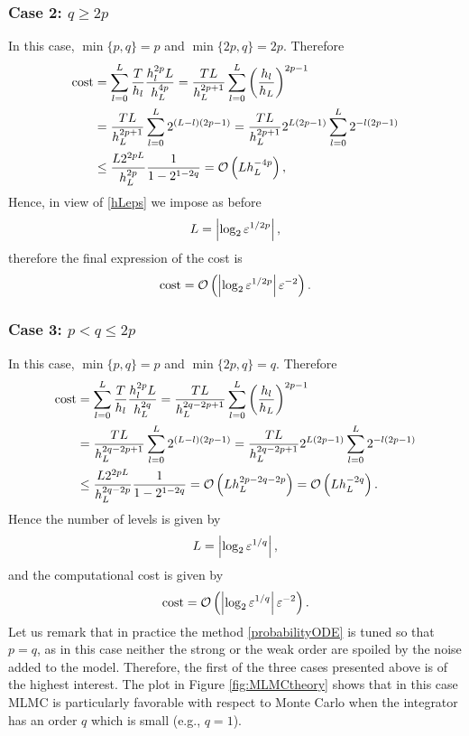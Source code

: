 \subsubsection*{Case 2: $q \geq 2p$}
In this case, $\min\{p, q\} = p$ and $\min\{2p, q\} = 2p$. Therefore
\begin{equation}
\begin{aligned}
\mathrm{cost} &=  \sum_{l=0}^L \frac{T}{h_l} \frac{h_l^{2p}L}{h_L^{4p}} = \frac{TL}{h_L^{2p+1}} \sum_{l=0}^L \left(\frac{h_l}{h_L}\right)^{2p-1} \\
&= \frac{TL}{h_L^{2p+1}} \sum_{l=0}^L 2^{(L-l)(2p-1)} = \frac{TL}{h_L^{2p+1}} 2^{L(2p-1)} \sum_{l=0}^L 2^{-l(2p-1)} \\
&\leq \frac{L2^{2pL}}{h_L^{2p}}\frac{1}{1 - 2^{1-2q}} = \mathcal{O}\left(L h_L^{-4p}\right),
\end{aligned}
\end{equation}
Hence, in view of \eqref{hLeps} we impose as before 
\begin{equation}
	L = \left|\log_2 \varepsilon^{1/2p}\right|,
\end{equation}
therefore the final expression of the cost is
\begin{equation}
	\mathrm{cost} = \mathcal{O}\left(\left|\log_2 \varepsilon^{1/2p}\right| \varepsilon^{-2}\right).
\end{equation}

\subsubsection*{Case 3: $p < q \leq 2p$}
In this case, $\min\{p, q\} = p$ and $\min\{2p, q\} = q$. Therefore
\begin{equation}
\begin{aligned}
\mathrm{cost} &=  \sum_{l=0}^L \frac{T}{h_l} \frac{h_l^{2p}L}{h_L^{2q}} = \frac{TL}{h_L^{2q - 2p+1}} \sum_{l=0}^L \left(\frac{h_l}{h_L}\right)^{2p-1} \\
&= \frac{TL}{h_L^{2q-2p+1}} \sum_{l=0}^L 2^{(L-l)(2p-1)} = \frac{TL}{h_L^{2q-2p+1}} 2^{L(2p-1)} \sum_{l=0}^L 2^{-l(2p-1)} \\
&\leq \frac{L2^{2pL}}{h_L^{2q-2p}}\frac{1}{1 - 2^{1-2q}} = \mathcal{O}\left(L h_L^{2p-2q-2p}\right) = \mathcal{O}\left(L h_L^{-2q}\right).
\end{aligned}
\end{equation}
Hence the number of levels is given by
\begin{equation}
	L = \left|\log_2 \varepsilon^{1/q} \right|,
\end{equation}
and the computational cost is given by
\begin{equation}
\mathrm{cost} = \mathcal{O}\left(\left|\log_2 \varepsilon^{1/q}\right| \varepsilon^{-2}\right).
\end{equation}
Let us remark that in practice the method \eqref{probabilityODE} is tuned so that $p = q$, as in this case neither the strong or the weak order are spoiled by the noise added to the model. Therefore, the first of the three cases presented above is of the highest interest. The plot in Figure \ref{fig:MLMCtheory} shows that in this case MLMC is particularly favorable with respect to Monte Carlo when the integrator has an order $q$ which is small (e.g., $q = 1$).

